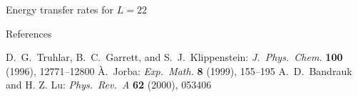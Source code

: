 \documentclass{theo1poster}[2003/04/25]
\begin{document}
\begin{poster}{3}
\begin{sheet}{Energy transfer rates for $L=22$}
\end{sheet}


\begin{sheet}{References}
\begin{thebibliography}{5}
  D.~G.~Truhlar, B.~C.~Garrett, and S.~J.~Klippenstein:
  \emph{J.~Phys.~Chem.} \textbf{100} (1996), 12771--12800
  \`A.~Jorba: \emph{Exp.~Math.} \textbf{8} (1999), 155--195
  A.~D.~Bandrauk and H. Z. Lu: \emph{Phys.~Rev.~A} \textbf{62} (2000), 053406
\end{thebibliography}
\end{sheet}



\end{poster}
\end{document}
